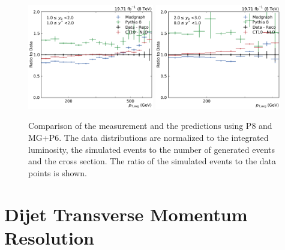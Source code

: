 \begin{figure}[htbp]
    \includegraphics[width=0.49\textwidth]{figures/measurement/ratio_reco_to_data_yb1ys1.pdf}\hfill
    \includegraphics[width=0.49\textwidth]{figures/measurement/ratio_reco_to_data_yb2ys0.pdf}
    \caption[Comparison of data with simulated events]{Comparison of the measurement and the predictions using P8 and MG+P6. The data distributions are normalized
    to the integrated luminosity, the simulated events to the number of generated events and the cross section. The ratio of the simulated
    events to the data points is shown.}
    \label{fig:ratio_recotodata}
\end{figure}


\section{Dijet Transverse Momentum  Resolution}
\label{sec:resolution}

